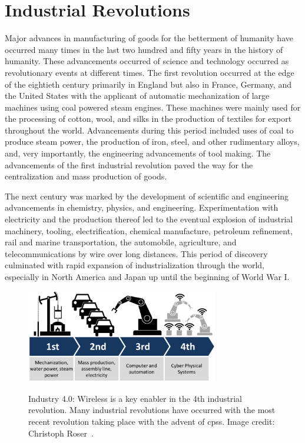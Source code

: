 \section{Industrial Revolutions}
Major advances in manufacturing of goods for the betterment of humanity have occurred many times in the last two hundred and fifty years in the history of humanity.  These advancements occurred of science and technology occurred as revolutionary events at different times.  The first revolution occurred at the edge of the eightieth century primarily in England but also in France, Germany, and the United States with the applicant of automatic mechanization of large machines using coal powered steam engines.  These machines were mainly used for the processing of cotton, wool, and silks in the production of textiles for export throughout the world.  Advancements during this period included uses of coal to produce steam power, the production of iron, steel, and other rudimentary alloys, and, very importantly, the engineering advancements of tool making.  The advancements of the first industrial revolution paved the way for the centralization and mass production of goods.

The next century was marked by the development of scientific and engineering advancements in chemistry, physics, and engineering. Experimentation with electricity and the production thereof led to the eventual explosion of industrial machinery, tooling, electrification, chemical manufacture, petroleum refinement, rail and marine transportation, the automobile, agriculture, and telecommunications by wire over long distances.  This period of discovery culminated with rapid expansion of industrialization through the world, especially in North America and Japan up until the beginning of World War I.

\begin{figure}[!tbp]
	\begin{center}
		\includegraphics[width=0.75\textwidth]{chapter-intro/images/forbes_2016_03_Industry_4.0}
		\label{fig:intro:forbes-i40-evolution}
		\caption{Industry 4.0: Wireless is a key enabler in the 4th industrial revolution.  Many industrial revolutions have occurred with the most recent revolution taking place with the advent of \glspl{cps}. Image credit: Christoph Roser~\cite{Roser2019}.}
	\end{center}
\end{figure}

